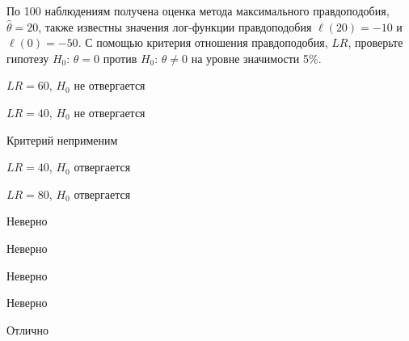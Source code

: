 
\begin{question}
По 100 наблюдениям получена оценка метода максимального правдоподобия,
\(\hat\theta = 20\), также известны значения лог-функции правдоподобия
\(\ell(20) = -10\) и \(\ell(0)= - 50\). С помощью критерия отношения
правдоподобия, \(LR\), проверьте гипотезу \(H_0\): \(\theta = 0\) против
\(H_0\): \(\theta \neq 0\) на уровне значимости 5\%.
\begin{answerlist}
  \item \(LR = 60\), \(H_0\) не отвергается
  \item \(LR = 40\), \(H_0\) не отвергается
  \item Критерий неприменим
  \item \(LR = 40\), \(H_0\) отвергается
  \item \(LR = 80\), \(H_0\) отвергается
\end{answerlist}
\end{question}

\begin{solution}
\begin{answerlist}
  \item Неверно
  \item Неверно
  \item Неверно
  \item Неверно
  \item Отлично
\end{answerlist}
\end{solution}

